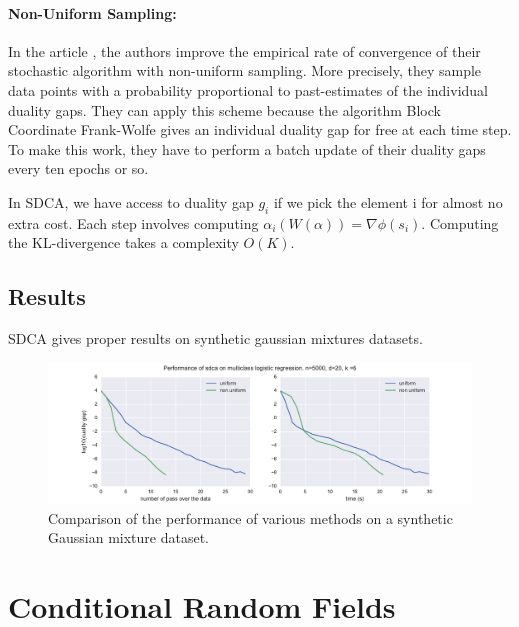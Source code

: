 \documentclass{article}
\DeclareMathOperator{\1}{\mathbb{1}}
\begin{document}
\paragraph{Non-Uniform Sampling:} 
In the article \cite{osokin_minding_2016}, the authors improve the empirical rate of convergence of their stochastic algorithm with non-uniform sampling.
More precisely, they sample data points with a probability proportional to past-estimates of the individual duality gaps.
They can apply this scheme because the algorithm Block Coordinate Frank-Wolfe \cite{lacoste-julien_block-coordinate_2012} gives an individual duality gap for free at each time step.
To make this work, they have to perform a batch update of their duality gaps every ten epochs or so.

In SDCA, we have access to duality gap $g_i$ if we pick the element i for almost no extra cost.
Each step involves computing $\alpha_i(W(\alpha))=\nabla\phi(s_i)$.
Computing the KL-divergence takes a complexity $O(K)$.

\subsection{Results}

SDCA gives proper results on synthetic gaussian mixtures datasets. 
\begin{figure}[ht]
	\label{gmm results}
	\includegraphics[width=\textwidth]{images/nonuniform_is_better.pdf}
	\caption{Comparison of the performance of various methods on a synthetic Gaussian mixture dataset.}
\end{figure}



\clearpage
\section{Conditional Random Fields}
\end{document}
